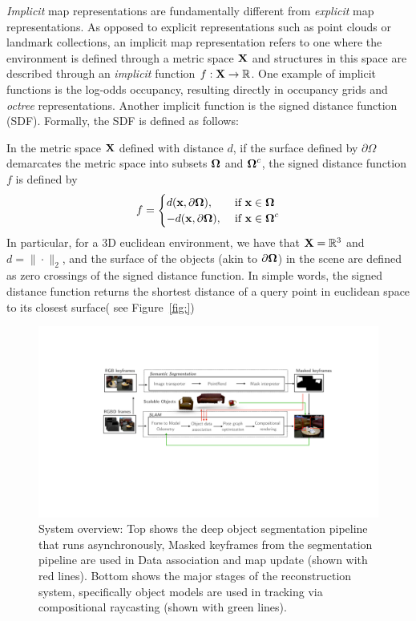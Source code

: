 \emph{Implicit} map representations are fundamentally different from \emph{explicit} map representations. As opposed to explicit representations such as point clouds or landmark collections, an implicit map representation refers to one where the environment is defined through a metric space $\mathbf{X}$ and structures in this space are described through an \emph{implicit} function $f : \mathbf{X} \rightarrow \mathbb{R}$. One example of implicit functions is the log-odds occupancy, resulting directly in occupancy grids \cite{thrun2005} and \emph{octree} \cite{hornung2013} representations. Another implicit function is the signed distance function (SDF). Formally, the SDF is defined as follows:

In the metric space $\mathbf{X}$ defined with distance $d$, if the surface defined by $\partial \Omega$ demarcates the metric space into subsets  $\boldsymbol \Omega$ and  $\boldsymbol \Omega^c$, the signed distance function $f$ is defined by
\begin{align*}
   f = \begin{cases}
       d(\mathbf{x}, \partial \boldsymbol \Omega), &\text{ if } \mathbf{x} \in \boldsymbol \Omega\\
       -d(\mathbf{x}, \partial \boldsymbol \Omega), &\text{ if } \mathbf{x} \in \boldsymbol \Omega^c
   \end{cases}
\end{align*}
In particular, for a 3D euclidean environment, we have that $\mathbf{X} = \mathbb{R}^3$ and $d = \|\cdot \|_2$, and the surface of the objects (akin to $\partial \boldsymbol \Omega$) in the scene are defined as zero crossings of the signed distance function. In simple words, the signed distance function returns the shortest distance of a query point in euclidean space to its closest surface( see Figure~\ref{fig:})



 \begin{figure}[ht!]
 	\centering
    \includegraphics[width=0.90\linewidth]{figs/icra2021-compressed.pdf}
    \caption{\label{fig:overview} System overview: Top shows the deep object segmentation pipeline that runs asynchronously, Masked keyframes from the segmentation pipeline are used in Data association and map update (shown with red lines). Bottom shows the major stages of the reconstruction system, specifically object models are used in tracking via compositional raycasting (shown with green lines).}
    \vspace*{-1em}
 \end{figure}
